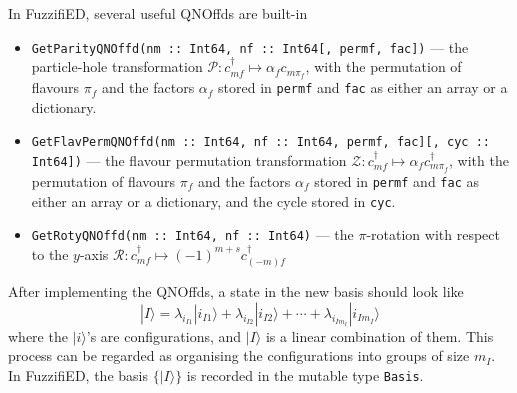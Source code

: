\documentclass{timesjhep}
\begin{document}
In FuzzifiED, several useful QNOffds are built-in
\begin{itemize}
    \item \lstinline|GetParityQNOffd(nm :: Int64, nf :: Int64[, permf, fac])| --- the particle-hole transformation $\mathscr{P}:c^\dagger_{mf}\mapsto\alpha_fc_{m\pi_f}$, with the permutation of flavours $\pi_f$ and the factors $\alpha_f$ stored in \lstinline|permf| and \lstinline|fac| as either an array or a dictionary. 
    \item \lstinline|GetFlavPermQNOffd(nm :: Int64, nf :: Int64, permf, fac][, cyc :: Int64])| --- the flavour permutation transformation $\mathscr{Z}:c^\dagger_{mf}\mapsto\alpha_fc_{m\pi_f}^\dagger$, with the permutation of flavours $\pi_f$ and the factors $\alpha_f$ stored in \lstinline|permf| and \lstinline|fac| as either an array or a dictionary, and the cycle stored in \lstinline|cyc|. 
    \item \lstinline|GetRotyQNOffd(nm :: Int64, nf :: Int64)| --- the $\pi$-rotation with respect to the $y$-axis $\mathscr{R}:c^\dagger_{mf}\mapsto(-1)^{m+s}c_{(-m)f}^\dagger$
\end{itemize}

After implementing the QNOffds, a state in the new basis should look like 
\begin{equation}
    |I\rangle=\lambda_{i_{I1}}|i_{I1}\rangle+\lambda_{i_{I2}}|i_{I2}\rangle+\cdots+\lambda_{i_{Im_I}}|i_{Im_I}\rangle
\end{equation}
where the $|i\rangle$'s are configurations, and $|I\rangle$ is a linear combination of them. This process can be regarded as organising the configurations into groups of size $m_I$. In FuzzifiED, the basis $\{|I\rangle\}$ is recorded in the mutable type \lstinline|Basis|. 
\end{document}
